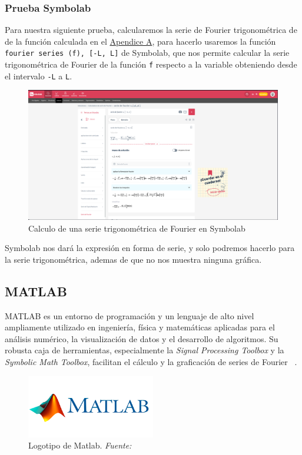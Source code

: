 \subsubsection{Prueba Symbolab}
Para nuestra siguiente prueba, calcularemos la serie de Fourier trigonométrica de de la función calculada en el \hyperref[app1:trig-coeff]{Apendice A}, para hacerlo usaremos la función \texttt{fourier series (f), [-L, L]} de Symbolab, que nos permite calcular la serie trigonométrica de Fourier de la función \texttt{f} respecto a la variable obteniendo desde el intervalo \texttt{-L} a \texttt{L}.
\begin{figure}[H]
	\centering
	\includegraphics[width=1\textwidth]{img/chapter02/symbolab-trig-series.png}
	\caption{Calculo de una serie trigonométrica de Fourier en Symbolab}
	\label{fig:symbolab-trig-series}  %
\end{figure}
Symbolab nos dará la expresión en forma de serie, y solo podremos hacerlo para la serie trigonométrica, ademas de que no nos muestra ninguna gráfica.

\subsection{MATLAB} 
MATLAB es un entorno de programación y un lenguaje de alto nivel ampliamente utilizado en ingeniería, física y matemáticas aplicadas para el análisis numérico, la visualización de datos y el desarrollo de algoritmos. Su robusta caja de herramientas, especialmente la \textit{Signal Processing Toolbox} y la \textit{Symbolic Math Toolbox}, facilitan el cálculo y la graficación de series de Fourier  ~\cite{MathWorks2024}.

\begin{figure}[H]
	\centering
	\includegraphics[width=0.5\textwidth]{img/chapter02/logo_matlab.png}
	\caption[Logotipo de Matlab.]{Logotipo de Matlab. \textit{Fuente: ~\cite{MathWorks2024}}}
	\label{fig:logo-matlab}  %
\end{figure}

